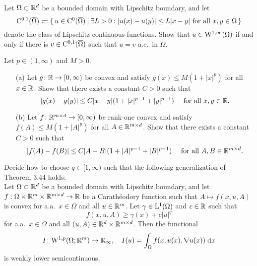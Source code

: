 \documentclass[12pt,a4paper]{article}
\begin{document}

\setcounter{AUFGABE}{25}

Let $\Omega\subset{\mathbb R}^d$ be a bounded domain with Lipschitz boundary, and let 
\[
{\mathrm C}^\text{0,1}(\overline\Omega)\coloneqq\{\, u\in{\mathrm C}^0(\overline\Omega) \: | \: \exists L>0: |u(x)-u(y)|\leq L|x-y|
\text{ for all }x,y\in\Omega \,\}
\]
denote the class of Lipschitz continuous functions. Show that $u\in{\mathrm W}^{1,\infty}(\Omega)$
if and only if
there is $v\in{\mathrm C}^{0,1}(\overline{\Omega})$ 
such that $u=v$ a.e.~in $\Omega$.

Let $p\in(1,\infty)$ and $M>0$. 
\begin{enumerate}
    \item [(a)]
    Let $g\colon{\mathbb R}\to[0,\infty)$ be convex and satisfy
    $g(x)\leq M(1+|x|^p)$ for all $x\in{\mathbb R}$.
    Show that there exists a constant $C>0$ such that
    \[
    |g(x)-g(y)|\leq C|x-y|(1+|x|^{p-1}+|y|^{p-1})
    \quad\text{ for all }x,y\in{\mathbb R}.
    \]
    \item[(b)]
    Let $f\colon{\mathbb R}^{m\times d}\to[0,\infty)$ be rank-one convex and satisfy
    $f(A)\leq M(1+|A|^p)$ for all $A\in{\mathbb R}^{m\times d}$.
    Show that there exists a constant $C>0$ such that
    \[
    |f(A)-f(B)|\leq C|A-B|(1+|A|^{p-1}+|B|^{p-1})
    \quad\text{ for all }A,B\in{\mathbb R}^{m\times d}.
    \]
\end{enumerate}


Decide how to choose $q\in[1,\infty)$ such that
the following generalization of Theorem 3.44 holds:
\\
Let $\Omega\subset{\mathbb R}^d$ be a bounded domain with Lipschitz boundary,
and let  $f:\Omega\times {\mathbb R}^m\times {\mathbb R}^{m\times d} \to {\mathbb R}$
be a Carath\'eodory function
such that $A\mapsto f(x,u,A)$ is convex for a.a.~$x\in\Omega$ and all $u\in{\mathbb R}^m$.
Let $\gamma\in{\mathrm L}^1(\Omega)$ and $c\in{\mathbb R}$ such that
\[
f(x,u,A)\geq \gamma(x)+c|u|^q
\]
for a.a.~$x\in\Omega$ and all $(u,A)\in{\mathbb R}^d\times{\mathbb R}^{m\times d}$.
Then the functional 
\[
I\colon {\mathrm W}^{1,p}(\Omega;{\mathbb R}^m)\to{\mathbb R}_\infty, \quad
I(u)=\int_\Omega f(x,u(x),\nabla u(x))\,\;\!\mathrm{d} x
\]
is weakly lower semicontinuous.
\end{document}
